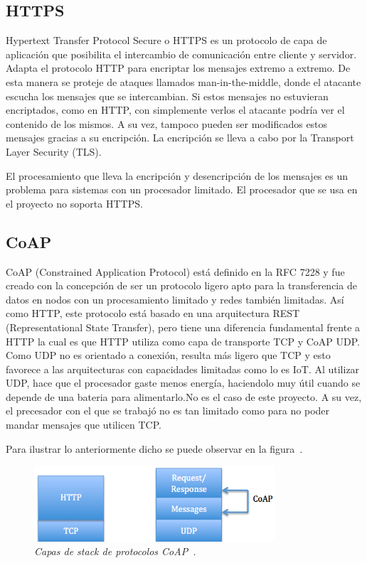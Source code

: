 \subsection{HTTPS}

Hypertext Transfer Protocol Secure o HTTPS es un protocolo de capa de aplicación que posibilita el intercambio de comunicación entre cliente y servidor. Adapta el protocolo HTTP para encriptar los mensajes extremo a extremo. De esta manera se proteje de ataques llamados man-in-the-middle, donde el atacante escucha los mensajes que se intercambian. Si estos mensajes no estuvieran encriptados, como en HTTP, con simplemente verlos el atacante podría ver el contenido de los mismos. A su vez, tampoco pueden ser modificados estos mensajes gracias a su encripción. La encripción se lleva a cabo por la Transport Layer Security (TLS).

El procesamiento que lleva la encripción y desencripción de los mensajes es un problema para sistemas con un procesador limitado. El procesador que se usa en el proyecto no soporta HTTPS.

\subsection{CoAP}

CoAP (Constrained Application Protocol) está definido en la RFC 7228 y fue creado con la concepción de ser un protocolo ligero apto para la transferencia de datos en nodos con un procesamiento limitado y redes también limitadas. Así como HTTP, este protocolo está basado en una arquitectura REST (Representational State Transfer), pero tiene una diferencia fundamental frente a HTTP la cual es que HTTP utiliza como capa de transporte TCP y CoAP UDP. Como UDP no es orientado a conexión, resulta más ligero que TCP y esto favorece a las arquitecturas con capacidades limitadas como lo es IoT. Al utilizar UDP, hace que el procesador gaste menos energía, haciendolo muy útil cuando se depende de una bateria para alimentarlo.No es el caso de este proyecto. A su vez, el precesador con el que se trabajó no es tan limitado como para no poder mandar mensajes que utilicen TCP. 

Para ilustrar lo anteriormente dicho se puede observar en la figura~.

\begin{figure}[h!]
  \centering
  \includegraphics[width=0.8\textwidth, keepaspectratio]{images/http-coap}
  \caption{\textit{Capas de stack de protocolos CoAP~\cite{HTTP_CoAP_img}.}}
  \label{fig:http_coap}
\end{figure}

